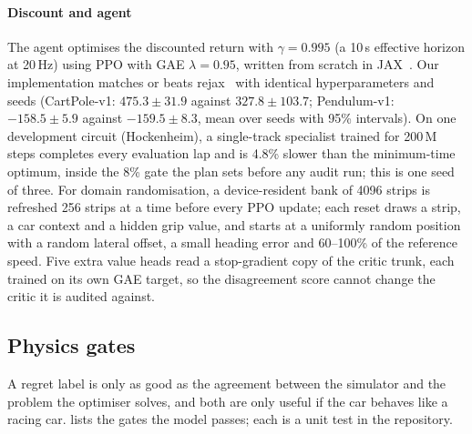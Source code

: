 \paragraph{Discount and agent} The agent optimises the discounted return with
$\gamma = 0.995$ (a 10\,s effective horizon at 20\,Hz) using PPO with GAE
$\lambda = 0.95$, written from scratch in JAX~\citep{schulman2017ppo,schulman2016gae}.
Our implementation matches or beats rejax~\citep{rejax} with identical hyperparameters
and seeds (CartPole-v1: $475.3 \pm 31.9$ against $327.8 \pm 103.7$; Pendulum-v1:
$-158.5 \pm 5.9$ against $-159.5 \pm 8.3$, mean over seeds with 95\% intervals).
On one development circuit (Hockenheim), a single-track specialist trained for
200\,M steps completes every evaluation lap and is 4.8\% slower than the minimum-time
optimum, inside the 8\% gate the plan sets before any audit run; this is one seed of three.
For domain randomisation, a device-resident bank of \num{4096} strips is refreshed 256
strips at a time before every PPO update; each reset draws a strip, a car context and a
hidden grip value, and starts at a uniformly random position with a random lateral offset,
a small heading error and 60--100\% of the reference speed.
Five extra value heads read a stop-gradient copy of the critic trunk, each trained on its
own GAE target, so the disagreement score cannot change the critic it is audited
against.

\subsection{Physics gates}
\label{sec:env-gates}

A regret label is only as good as the agreement between the simulator and the problem the
optimiser solves, and both are only useful if the car behaves like a racing car.
 lists the gates the model passes; each is a unit test in the repository.

